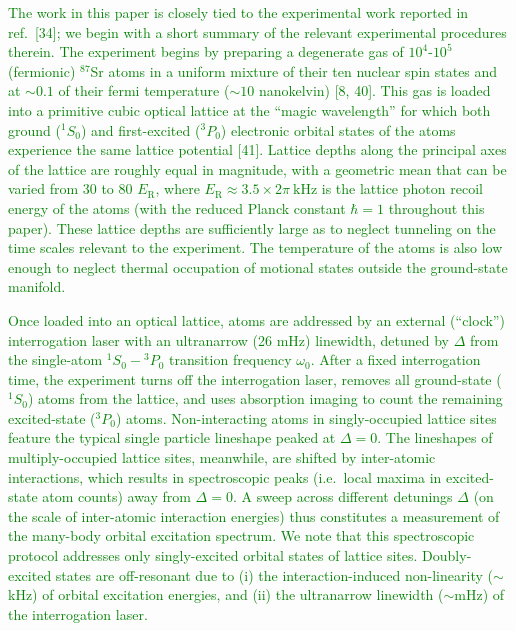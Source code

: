 \documentclass[preprint]{revtex4-1}
\renewcommand{\t}{\text} %
\newcommand{\1}{\mathds{1}}
\newcommand{\green}[1]{\textcolor{green}{#1}}
\newcounter{point}
\begin{document}
\begin{enumerate}[label=(R1.\arabic{point}.\arabic*)]
  \green{The work in this paper is closely tied to the experimental
    work reported in ref.~[34]; we begin with a short summary of the
    relevant experimental procedures therein.  The experiment begins
    by preparing a degenerate gas of $10^4$-$10^5$ (fermionic)
    ${}^{87}$Sr atoms in a uniform mixture of their ten nuclear spin
    states and at $\sim0.1$ of their fermi temperature ($\sim10$
    nanokelvin) [8, 40].  This gas is loaded into a primitive cubic
    optical lattice at the ``magic wavelength'' for which both ground
    (${}^1S_0$) and first-excited (${}^3P_0$) electronic orbital
    states of the atoms experience the same lattice potential [41].
    Lattice depths along the principal axes of the lattice are roughly
    equal in magnitude, with a geometric mean that can be varied from
    30 to 80 $E_{\t{R}}$, where
    $E_{\t{R}}\approx3.5\times2\pi~\t{kHz}$ is the lattice photon
    recoil energy of the atoms (with the reduced Planck constant
    $\hbar=1$ throughout this paper).  These lattice depths are
    sufficiently large as to neglect tunneling on the time scales
    relevant to the experiment.  The temperature of the atoms is also
    low enough to neglect thermal occupation of motional states
    outside the ground-state manifold.}

  \green{Once loaded into an optical lattice, atoms are addressed by
    an external (``clock'') interrogation laser with an ultranarrow
    (26 mHz) linewidth, detuned by $\Delta$ from the single-atom
    ${}^1S_0-{}^3P_0$ transition frequency $\omega_0$.  After a fixed
    interrogation time, the experiment turns off the interrogation
    laser, removes all ground-state (${}^1S_0$) atoms from the
    lattice, and uses absorption imaging to count the remaining
    excited-state (${}^3P_0$) atoms.  Non-interacting atoms in
    singly-occupied lattice sites feature the typical single particle
    lineshape peaked at $\Delta=0$.  The lineshapes of
    multiply-occupied lattice sites, meanwhile, are shifted by
    inter-atomic interactions, which results in spectroscopic peaks
    (i.e.~local maxima in excited-state atom counts) away from
    $\Delta=0$.  A sweep across different detunings $\Delta$ (on the
    scale of inter-atomic interaction energies) thus constitutes a
    measurement of the many-body orbital excitation spectrum.  We note
    that this spectroscopic protocol addresses only singly-excited
    orbital states of lattice sites.  Doubly-excited states are
    off-resonant due to (i) the interaction-induced non-linearity
    ($\sim$kHz) of orbital excitation energies, and (ii) the
    ultranarrow linewidth ($\sim$mHz) of the interrogation laser.}


\end{enumerate}
\end{document}
